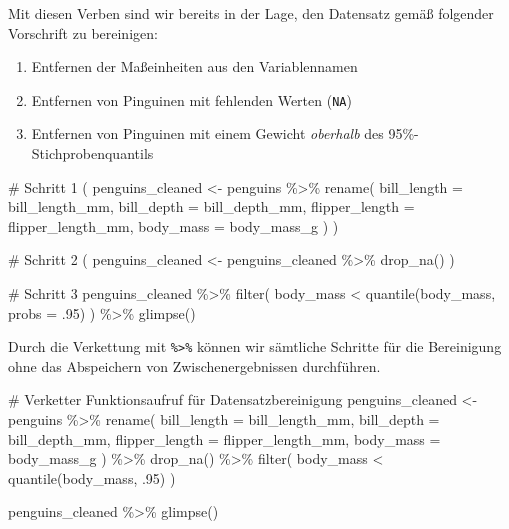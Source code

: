 \documentclass[
  a4paper,
  DIV=11,
  oneside]{scrreprt}
\newenvironment{Shaded}{\begin{snugshade}}{\end{snugshade}}
\newcommand{\NormalTok}[1]{\textcolor[rgb]{0.00,0.23,0.31}{#1}}
\providecommand{\tightlist}{%
  \setlength{\itemsep}{0pt}\setlength{\parskip}{0pt}}\usepackage{longtable,booktabs,array}
\begin{document}
Mit diesen Verben sind wir bereits in der Lage, den Datensatz gemäß
folgender Vorschrift zu bereinigen:

\begin{enumerate}
\def\labelenumi{\arabic{enumi}.}
\tightlist
\item
  Entfernen der Maßeinheiten aus den Variablennamen
\item
  Entfernen von Pinguinen mit fehlenden Werten (\texttt{NA})
\item
  Entfernen von Pinguinen mit einem Gewicht \emph{oberhalb} des
  95\%-Stichprobenquantils
\end{enumerate}

\begin{Shaded}
\begin{Highlighting}[]
\NormalTok{\# Schritt 1}
\NormalTok{(}
\NormalTok{  penguins\_cleaned \textless{}{-} penguins \%\textgreater{}\% }
\NormalTok{    rename(}
\NormalTok{      bill\_length = bill\_length\_mm,}
\NormalTok{      bill\_depth  = bill\_depth\_mm,}
\NormalTok{      flipper\_length = flipper\_length\_mm,}
\NormalTok{      body\_mass = body\_mass\_g}
\NormalTok{    )}
\NormalTok{)}
\end{Highlighting}
\end{Shaded}

\begin{Shaded}
\begin{Highlighting}[]
\NormalTok{\# Schritt 2}
\NormalTok{(}
\NormalTok{  penguins\_cleaned \textless{}{-} penguins\_cleaned \%\textgreater{}\%}
\NormalTok{    drop\_na()}
\NormalTok{)}
\end{Highlighting}
\end{Shaded}

\begin{Shaded}
\begin{Highlighting}[]
\NormalTok{\# Schritt 3}
\NormalTok{penguins\_cleaned \%\textgreater{}\% }
\NormalTok{  filter(}
\NormalTok{    body\_mass \textless{} quantile(body\_mass, probs = .95)}
\NormalTok{  ) \%\textgreater{}\%}
\NormalTok{  glimpse()}
\end{Highlighting}
\end{Shaded}

Durch die Verkettung mit \texttt{\%\textgreater{}\%} können wir
sämtliche Schritte für die Bereinigung ohne das Abspeichern von
Zwischenergebnissen durchführen.

\begin{Shaded}
\begin{Highlighting}[]
\NormalTok{\# Verketter Funktionsaufruf für Datensatzbereinigung}
\NormalTok{penguins\_cleaned \textless{}{-} penguins \%\textgreater{}\% }
\NormalTok{  rename(}
\NormalTok{    bill\_length = bill\_length\_mm,}
\NormalTok{    bill\_depth  = bill\_depth\_mm,}
\NormalTok{    flipper\_length = flipper\_length\_mm,}
\NormalTok{    body\_mass = body\_mass\_g}
\NormalTok{  ) \%\textgreater{}\% }
\NormalTok{  drop\_na() \%\textgreater{}\% }
\NormalTok{  filter(}
\NormalTok{    body\_mass \textless{} quantile(body\_mass, .95)}
\NormalTok{  )}

\NormalTok{penguins\_cleaned \%\textgreater{}\% }
\NormalTok{  glimpse()}
\end{Highlighting}
\end{Shaded}
\end{document}
